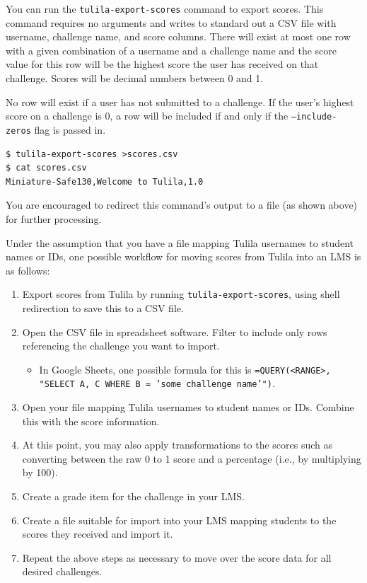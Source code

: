 \documentclass[12pt]{article}
\begin{document}
You can run the \texttt{tulila-export-scores} command to export scores. This command requires no arguments and writes to standard out a CSV file with username, challenge name, and score columns. There will exist at most one row with a given combination of a username and a challenge name and the score value for this row will be the highest score the user has received on that challenge. Scores will be decimal numbers between 0 and 1.

No row will exist if a user has not submitted to a challenge. If the user's highest score on a challenge is 0, a row will be included if and only if the \texttt{--include-zeros} flag is passed in.

\begin{Verbatim}
$ tulila-export-scores >scores.csv
$ cat scores.csv
Miniature-Safe130,Welcome to Tulila,1.0
\end{Verbatim}

You are encouraged to redirect this command's output to a file (as shown above) for further processing.

Under the assumption that you have a file mapping Tulila usernames to student names or IDs, one possible workflow for moving scores from Tulila into an LMS is as follows:
\begin{enumerate}
  \item Export scores from Tulila by running \texttt{tulila-export-scores}, using shell redirection to save this to a CSV file.
  \item Open the CSV file in spreadsheet software. Filter to include only rows referencing the challenge you want to import.
  \begin{itemize}[$\circ$]
    \item In Google Sheets, one possible formula for this is \texttt{=QUERY(<RANGE>, "SELECT A, C WHERE B = 'some challenge name'")}.
  \end{itemize}
  \item Open your file mapping Tulila usernames to student names or IDs. Combine this with the score information.
  \item At this point, you may also apply transformations to the scores such as converting between the raw 0 to 1 score and a percentage (i.e., by multiplying by 100).
  \item Create a grade item for the challenge in your LMS.
  \item Create a file suitable for import into your LMS mapping students to the scores they received and import it.
  \item Repeat the above steps as necessary to move over the score data for all desired challenges.
\end{enumerate}
\end{document}
